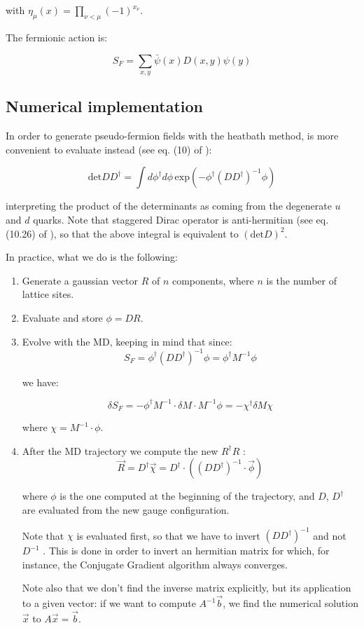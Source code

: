 \documentclass[12pt, a4paper]{article}
\begin{document}
with $\eta_{\mu}(x) = \prod_{\nu<\mu} (-1)^{x_{\nu}}$.

The fermionic action is:

\begin{equation}
S_F = \sum_{x, y} \bar{\psi}(x) D(x,y) \psi(y)
\end{equation}

\subsection{Numerical implementation}

In order to generate pseudo-fermion fields with the heatbath method, is more convenient to evaluate instead (see eq. (10) of \cite{BITAR1989377}):

$$
\text{det} D D^{\dagger} = 
\int d \phi^{\dagger} d \phi 
\, \text{exp}(-\phi^{\dagger} (D D^{\dagger})^{-1} \phi)
$$

interpreting the product of the determinants as coming from the degenerate $u$ and $d$ quarks. 
Note that staggered Dirac operator is anti-hermitian 
(see eq. (10.26) of \cite{gattringer2009quantum}), 
so that the above integral is equivalent to $( \text{det} D)^2$.

In practice, what we do is the following:

\begin{enumerate}
    \item
    Generate a gaussian vector $R$ of $n$ components, where 
    $n$ is the number of lattice sites.
    \item
    Evaluate and store $\phi = D R$.
    \item
    Evolve with the MD, keeping in mind that since:
    $$
    S_F = 
    \phi^{\dagger} (D D^{\dagger})^{-1} \phi = 
    \phi^{\dagger} M^{-1} \phi
    $$
    
    we have:
    
    \begin{equation} \label{eq:dSF.generic}
    \delta S_F 
    = - \phi^{\dagger} M^{-1} \cdot \delta M \cdot M^{-1} \phi 
    = - \chi^{\dagger} \delta M \chi
    \end{equation}

    
    where $\chi = M^{-1} \cdot \phi$.
    \item
    After the MD trajectory we compute the new $R^{\dagger} R$ :
    $$
    \vec{R} = D^{\dagger} \vec{\chi} 
    = D^{\dagger} \cdot ( (D D^{\dagger})^{-1} \cdot \vec{\phi})
    $$
    
    where $\phi$ is the one computed at the beginning of the trajectory, 
    and $D$, $D^{\dagger}$ are evaluated from the new gauge configuration. 
    
    Note that $\chi$ is evaluated first, 
    so that we have to invert $(D D^{\dagger})^{-1}$ and not $D^{-1}$ . 
    This is done in order to invert an hermitian matrix for which, for instance, 
    the Conjugate Gradient algorithm always converges.
    
    Note also that we don't find the inverse matrix explicitly, 
    but its application to a given vector: 
    if we want to compute $A^{-1} \vec{b}$, 
    we find the numerical solution $\vec{x}$ to $A \vec{x} = \vec{b}$.
\end{enumerate}
\end{document}
